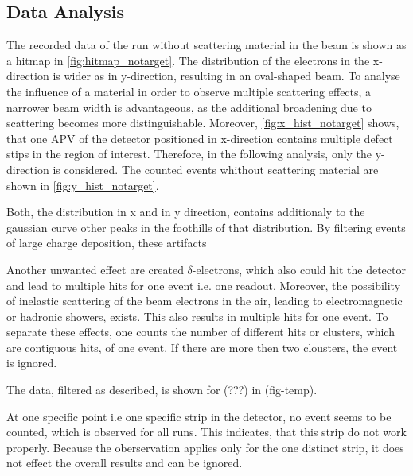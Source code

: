 \documentclass[sn-mathphys-num,iicol]{sn-jnl}
\theoremstyle{thmstyleone}
\theoremstyle{thmstyletwo}
\theoremstyle{thmstylethree}
\begin{document}
\subsection{Data Analysis}
The recorded data of the run without scattering material in the beam is shown as a hitmap in \autoref{fig:hitmap_notarget}. The distribution of the electrons in the x-direction is wider as in y-direction, resulting in an oval-shaped beam.
To analyse the influence of a material in order to observe multiple scattering effects, a narrower beam width is advantageous, as the additional broadening due to scattering becomes more distinguishable.
Moreover, \autoref{fig:x_hist_notarget} shows, that one APV of the detector positioned in x-direction contains multiple defect stips in the region of interest.
Therefore, in the following analysis, only the y-direction is considered. The counted events whithout scattering material are shown in \autoref{fig:y_hist_notarget}.

Both, the distribution in x and in y direction, contains additionaly to the gaussian curve other peaks in the foothills of that distribution.
By filtering events of large charge deposition, these artifacts 





Another unwanted effect are created $\delta$-electrons, which also could hit the detector and lead to multiple hits for one event i.e. one readout.
Moreover, the possibility of inelastic scattering of the beam electrons in the air, leading to electromagnetic or hadronic showers, exists.
This also results in multiple hits for one event. To separate these effects, one counts the number of different hits or clusters, which are contiguous hits, of one event. If there are more then two clousters, the event is ignored.

The data, filtered as described, is shown for (???) in (fig-temp).

At one specific point i.e one specific strip in the detector, no event seems to be counted, which is observed for all runs. This indicates, that this strip do not work properly. Because the oberservation applies only for the one distinct strip, it does not effect the overall results and can be ignored.
\end{document}
